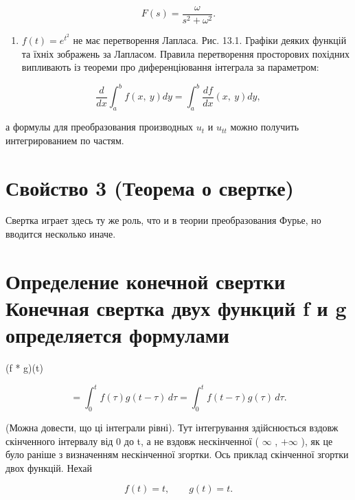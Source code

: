 \documentclass[
  ukrainian,
]{article}
\providecommand{\tightlist}{%
  \setlength{\itemsep}{0pt}\setlength{\parskip}{0pt}}
\begin{document}
\[
F(s)=\frac{\omega}{s^2+\omega^2}.
\]

\begin{enumerate}
\def\labelenumi{\arabic{enumi}.}
\setcounter{enumi}{3}
\tightlist
\item
  \(f(t)=e^{t^2}\) не має перетворення Лапласа. Рис. 13.1. Графіки
  деяких функцій та їхніх зображень за Лапласом. Правила перетворення
  просторових похідних випливають із теореми про диференціювання
  інтеграла за параметром:
\end{enumerate}

\[
\frac{d}{dx}\int_{a}^{b}f\left(x,\ y\right)dy=\int_{a}^{b}\frac{df}{dx}\left(x,\ y\right)dy,
\]

а формулы для преобразования производных \(u_t\) и \(u_{tt}\) можно
получить интегрированием по частям.

\section{Свойство 3 (Теорема о
свертке)}\label{ux441ux432ux43eux439ux441ux442ux432ux43e-3-ux442ux435ux43eux440ux435ux43cux430-ux43e-ux441ux432ux435ux440ux442ux43aux435}

Свертка играет здесь ту же роль, что и в теории преобразования Фурье, но
вводится несколько иначе.

\section{Определение конечной свертки Конечная свертка двух функций f и
g определяется
формулами}\label{ux43eux43fux440ux435ux434ux435ux43bux435ux43dux438ux435-ux43aux43eux43dux435ux447ux43dux43eux439-ux441ux432ux435ux440ux442ux43aux438-ux43aux43eux43dux435ux447ux43dux430ux44f-ux441ux432ux435ux440ux442ux43aux430-ux434ux432ux443ux445-ux444ux443ux43dux43aux446ux438ux439-f-ux438-g-ux43eux43fux440ux435ux434ux435ux43bux44fux435ux442ux441ux44f-ux444ux43eux440ux43cux443ux43bux430ux43cux438}

(f * g)(t)

\[
= \int_0^t f(\tau)g(t-\tau)\,d\tau
= \int_0^t f(t-\tau)g(\tau)\,d\tau.
\]

(Можна довести, що ці інтеграли рівні). Тут інтегрування здійснюється
вздовж скінченного інтервалу від 0 до t, а не вздовж нескінченної (
\(\infty\) , \(+\infty\) ), як це було раніше з визначенням нескінченної
згортки. Ось приклад скінченної згортки двох функцій. Нехай

\[
f(t)=t,\qquad g(t)=t.
\]
\end{document}
